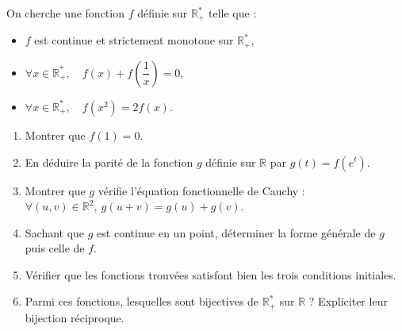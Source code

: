 \documentclass[11pt]{article}
\begin{document}
\begin{exercice}
On cherche une fonction $f$ définie sur $\mathbb{R}^*_+$ telle que :
\begin{itemize}
    \item $f$ est continue et strictement monotone sur $\mathbb{R}^*_+$,
    \item $\forall x \in \mathbb{R}^*_+,\quad f(x) + f\left(\dfrac{1}{x}\right) = 0$,
    \item $\forall x \in \mathbb{R}^*_+,\quad f(x^2) = 2f(x)$.
\end{itemize}
\begin{enumerate}
    \item Montrer que $f(1)=0$.
    \item En déduire la parité de la fonction $g$ définie sur $\mathbb{R}$ par $g(t)=f(e^t)$.
    \item Montrer que $g$ vérifie l'équation fonctionnelle de Cauchy : $\forall (u,v)\in\mathbb{R}^2,\ g(u+v)=g(u)+g(v)$.
    \item Sachant que $g$ est continue en un point, déterminer la forme générale de $g$ puis celle de $f$.
    \item Vérifier que les fonctions trouvées satisfont bien les trois conditions initiales.
    \item Parmi ces fonctions, lesquelles sont bijectives de $\mathbb{R}^*_+$ sur $\mathbb{R}$ ? Expliciter leur bijection réciproque.
\end{enumerate}
\end{exercice}
\end{document}

